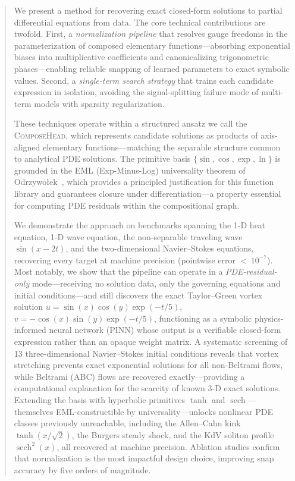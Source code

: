 \begin{abstract}
We present a method for recovering exact closed-form solutions to partial
differential equations from data.  The core technical contributions are twofold.
First, a \emph{normalization pipeline} that resolves gauge freedoms in the
parameterization of composed elementary functions---absorbing exponential biases
into multiplicative coefficients and canonicalizing trigonometric
phases---enabling reliable snapping of learned parameters to exact symbolic
values.  Second, a \emph{single-term search strategy} that trains each candidate
expression in isolation, avoiding the signal-splitting failure mode of
multi-term models with sparsity regularization.

These techniques operate within a structured ansatz we call the
\textsc{ComposeHead}, which represents candidate solutions as products of
axis-aligned elementary functions---matching the separable structure common to
analytical PDE solutions.  The primitive basis
$\{\sin, \cos, \exp, \ln\}$ is grounded in the EML (Exp-Minus-Log) universality
theorem of Odrzywo{\l}ek~\cite{odrzywołek2026}, which provides a principled
justification for this function library and guarantees closure under
differentiation---a property essential for computing PDE residuals within the
compositional graph.

We demonstrate the approach on benchmarks spanning the 1-D heat equation, 1-D
wave equation, the non-separable traveling wave $\sin(x - 2t)$, and the
two-dimensional Navier--Stokes equations, recovering every target at machine
precision (pointwise error ${<}\,10^{-7}$).  Most notably, we show that the
pipeline can operate in a \emph{PDE-residual-only} mode---receiving no
solution data, only the governing equations and initial conditions---and still
discovers the exact Taylor--Green vortex solution
$u = \sin(x)\cos(y)\exp(-t/5)$,\;$v = -\cos(x)\sin(y)\exp(-t/5)$,
functioning as a symbolic physics-informed neural network (PINN) whose output
is a verifiable closed-form expression rather than an opaque weight matrix.
A systematic screening of 13 three-dimensional Navier--Stokes initial
conditions reveals that vortex stretching prevents exact exponential
solutions for all non-Beltrami flows, while Beltrami (ABC) flows are
recovered exactly---providing a computational explanation for the scarcity
of known 3-D exact solutions.  Extending the basis with hyperbolic
primitives $\tanh$ and $\operatorname{sech}$---themselves EML-constructible
by universality---unlocks nonlinear PDE classes previously unreachable,
including the Allen--Cahn kink $\tanh(x/\sqrt{2})$, the Burgers steady
shock, and the KdV soliton profile $\operatorname{sech}^{2}(x)$, all
recovered at machine precision.  Ablation studies confirm that normalization
is the most impactful design choice, improving snap accuracy by five orders
of magnitude.
\end{abstract}
